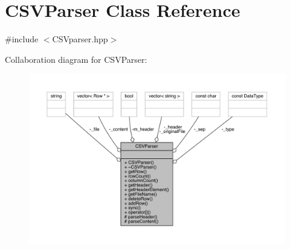 \hypertarget{class_c_s_v_parser}{}\section{C\+S\+V\+Parser Class Reference}
\label{class_c_s_v_parser}


{\ttfamily \#include $<$C\+S\+Vparser.\+hpp$>$}



Collaboration diagram for C\+S\+V\+Parser\+:
\nopagebreak
\begin{figure}[H]
\begin{center}
\leavevmode
\includegraphics[width=350pt]{class_c_s_v_parser__coll__graph}
\end{center}
\end{figure}
